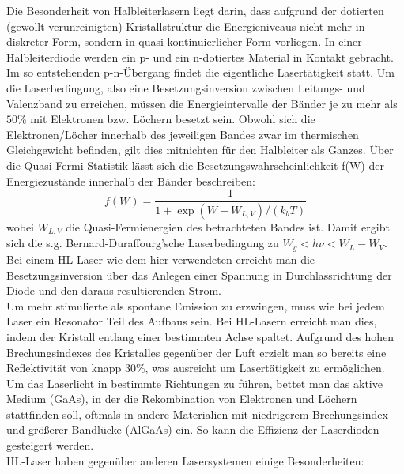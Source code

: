 \documentclass[twoside,colorback,accentcolor=tud4c,11pt]{tudreport}
\begin{document}
Die Besonderheit von Halbleiterlasern liegt darin, dass aufgrund der dotierten (gewollt verunreinigten) Kristallstruktur die Energieniveaus nicht mehr in diskreter Form, sondern in quasi-kontinuierlicher Form vorliegen. In einer Halbleiterdiode werden ein p- und ein n-dotiertes Material in Kontakt gebracht. Im so entstehenden p-n-Übergang findet die eigentliche Lasertätigkeit statt. Um die Laserbedingung, also eine Besetzungsinversion zwischen Leitungs- und Valenzband zu erreichen, müssen die Energieintervalle der Bänder je zu mehr als $50\%$ mit Elektronen bzw. Löchern besetzt sein. Obwohl sich die Elektronen/Löcher innerhalb des jeweiligen Bandes zwar im thermischen Gleichgewicht befinden, gilt dies mitnichten für den Halbleiter als Ganzes. Über die Quasi-Fermi-Statistik lässt sich die Besetzungswahrscheinlichkeit f(W) der Energiezustände innerhalb der Bänder beschreiben:
\begin{equation}
f(W)=\frac{1}{1+\exp\left(W-W_{L,V}\right)/ (k_{b}T)}
\end{equation}
wobei $W_{L,V}$ die Quasi-Fermienergien des betrachteten Bandes ist. Damit ergibt sich die s.g. Bernard-Duraffourg'sche Laserbedingung zu $W_{g}<h\nu <W_{L}-W_{V}$. Bei einem HL-Laser wie dem hier verwendeten erreicht man die Besetzungsinversion über das Anlegen einer Spannung in Durchlassrichtung der Diode und den daraus resultierenden Strom. \\
Um mehr stimulierte als spontane Emission zu erzwingen, muss wie bei jedem Laser ein Resonator Teil des Aufbaus sein. Bei HL-Lasern erreicht man dies, indem der Kristall entlang einer bestimmten Achse spaltet. Aufgrund des hohen Brechungsindexes des Kristalles gegenüber der Luft erzielt man so bereits eine Reflektivität von knapp 30\%, was ausreicht um Lasertätigkeit zu ermöglichen. Um das Laserlicht in bestimmte Richtungen zu führen, bettet man das aktive Medium (GaAs), in der die Rekombination von Elektronen und Löchern stattfinden soll, oftmals in andere Materialien mit niedrigerem Brechungsindex und größerer Bandlücke (AlGaAs) ein. So kann die Effizienz der Laserdioden gesteigert werden.\\
HL-Laser haben gegenüber anderen Lasersystemen einige Besonderheiten:
\end{document}
